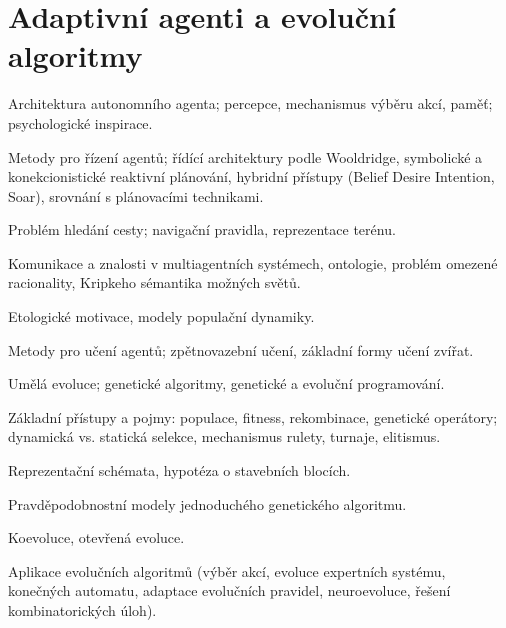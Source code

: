 \newpage
\section{Adaptivní agenti a evoluční algoritmy}
\begin{pozadavky}
\begin{pitemize}
\item Architektura autonomního agenta; percepce, mechanismus výběru akcí, paměť; psychologické inspirace.
\item Metody pro řízení agentů; řídící architektury podle Wooldridge, symbolické a konekcionistické reaktivní plánování, hybridní přístupy (Belief Desire Intention, Soar), srovnání s plánovacími technikami.
\item Problém hledání cesty; navigační pravidla, reprezentace terénu.
\item Komunikace a znalosti v multiagentních systémech, ontologie, problém omezené racionality, Kripkeho sémantika možných světů.
\item Etologické motivace, modely populační dynamiky.
\item Metody pro učení agentů; zpětnovazební učení, základní formy učení zvířat.
\item Umělá evoluce; genetické algoritmy, genetické a evoluční programování. 
\item Základní přístupy a pojmy: populace, fitness, rekombinace, genetické operátory; dynamická vs. statická selekce, mechanismus rulety, turnaje, elitismus.
\item Reprezentační schémata, hypotéza o stavebních blocích.
\item Pravděpodobnostní modely jednoduchého genetického algoritmu.
\item Koevoluce, otevřená evoluce.
\item Aplikace evolučních algoritmů (výběr akcí, evoluce expertních systému, konečných automatu, adaptace evolučních pravidel, neuroevoluce, řešení kombinatorických úloh).
\end{pitemize}
\end{pozadavky}